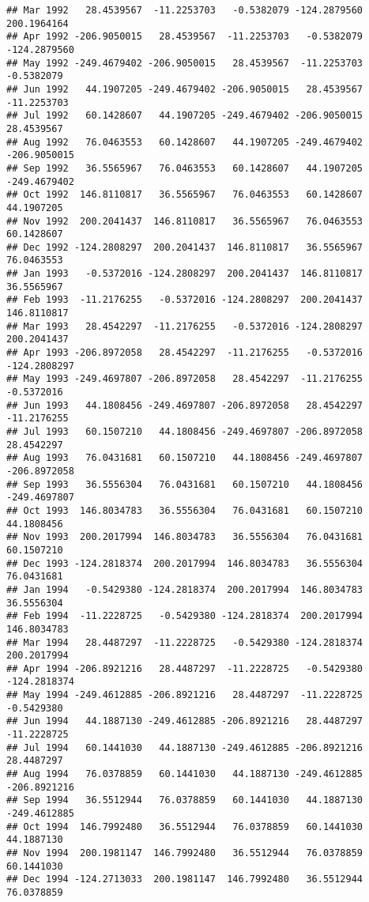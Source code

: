 \documentclass[]{article}
\begin{document}
\begin{verbatim}
## Mar 1992   28.4539567  -11.2253703   -0.5382079 -124.2879560  200.1964164
## Apr 1992 -206.9050015   28.4539567  -11.2253703   -0.5382079 -124.2879560
## May 1992 -249.4679402 -206.9050015   28.4539567  -11.2253703   -0.5382079
## Jun 1992   44.1907205 -249.4679402 -206.9050015   28.4539567  -11.2253703
## Jul 1992   60.1428607   44.1907205 -249.4679402 -206.9050015   28.4539567
## Aug 1992   76.0463553   60.1428607   44.1907205 -249.4679402 -206.9050015
## Sep 1992   36.5565967   76.0463553   60.1428607   44.1907205 -249.4679402
## Oct 1992  146.8110817   36.5565967   76.0463553   60.1428607   44.1907205
## Nov 1992  200.2041437  146.8110817   36.5565967   76.0463553   60.1428607
## Dec 1992 -124.2808297  200.2041437  146.8110817   36.5565967   76.0463553
## Jan 1993   -0.5372016 -124.2808297  200.2041437  146.8110817   36.5565967
## Feb 1993  -11.2176255   -0.5372016 -124.2808297  200.2041437  146.8110817
## Mar 1993   28.4542297  -11.2176255   -0.5372016 -124.2808297  200.2041437
## Apr 1993 -206.8972058   28.4542297  -11.2176255   -0.5372016 -124.2808297
## May 1993 -249.4697807 -206.8972058   28.4542297  -11.2176255   -0.5372016
## Jun 1993   44.1808456 -249.4697807 -206.8972058   28.4542297  -11.2176255
## Jul 1993   60.1507210   44.1808456 -249.4697807 -206.8972058   28.4542297
## Aug 1993   76.0431681   60.1507210   44.1808456 -249.4697807 -206.8972058
## Sep 1993   36.5556304   76.0431681   60.1507210   44.1808456 -249.4697807
## Oct 1993  146.8034783   36.5556304   76.0431681   60.1507210   44.1808456
## Nov 1993  200.2017994  146.8034783   36.5556304   76.0431681   60.1507210
## Dec 1993 -124.2818374  200.2017994  146.8034783   36.5556304   76.0431681
## Jan 1994   -0.5429380 -124.2818374  200.2017994  146.8034783   36.5556304
## Feb 1994  -11.2228725   -0.5429380 -124.2818374  200.2017994  146.8034783
## Mar 1994   28.4487297  -11.2228725   -0.5429380 -124.2818374  200.2017994
## Apr 1994 -206.8921216   28.4487297  -11.2228725   -0.5429380 -124.2818374
## May 1994 -249.4612885 -206.8921216   28.4487297  -11.2228725   -0.5429380
## Jun 1994   44.1887130 -249.4612885 -206.8921216   28.4487297  -11.2228725
## Jul 1994   60.1441030   44.1887130 -249.4612885 -206.8921216   28.4487297
## Aug 1994   76.0378859   60.1441030   44.1887130 -249.4612885 -206.8921216
## Sep 1994   36.5512944   76.0378859   60.1441030   44.1887130 -249.4612885
## Oct 1994  146.7992480   36.5512944   76.0378859   60.1441030   44.1887130
## Nov 1994  200.1981147  146.7992480   36.5512944   76.0378859   60.1441030
## Dec 1994 -124.2713033  200.1981147  146.7992480   36.5512944   76.0378859

\end{verbatim}
\end{document}
